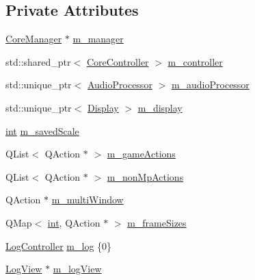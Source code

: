 \subsection*{Private Attributes}
\begin{DoxyCompactItemize}
\item 
\mbox{\hyperlink{class_q_g_b_a_1_1_core_manager}{Core\+Manager}} $\ast$ \mbox{\hyperlink{class_q_g_b_a_1_1_window_ae6749aa95d0f10edc7b8cc9e367bc45d}{m\+\_\+manager}}
\item 
std\+::shared\+\_\+ptr$<$ \mbox{\hyperlink{class_q_g_b_a_1_1_core_controller}{Core\+Controller}} $>$ \mbox{\hyperlink{class_q_g_b_a_1_1_window_af35a37be583d911f9ac403912e99fb65}{m\+\_\+controller}}
\item 
std\+::unique\+\_\+ptr$<$ \mbox{\hyperlink{class_q_g_b_a_1_1_audio_processor}{Audio\+Processor}} $>$ \mbox{\hyperlink{class_q_g_b_a_1_1_window_ac81ac93ee2551f551d93ed0b9f020579}{m\+\_\+audio\+Processor}}
\item 
std\+::unique\+\_\+ptr$<$ \mbox{\hyperlink{class_q_g_b_a_1_1_display}{Display}} $>$ \mbox{\hyperlink{class_q_g_b_a_1_1_window_ae811273df69f8dab13ad706e8b3f8d1a}{m\+\_\+display}}
\item 
\mbox{\hyperlink{ioapi_8h_a787fa3cf048117ba7123753c1e74fcd6}{int}} \mbox{\hyperlink{class_q_g_b_a_1_1_window_a5527e27d8324c56e497a91c9b1153aaa}{m\+\_\+saved\+Scale}}
\item 
Q\+List$<$ Q\+Action $\ast$ $>$ \mbox{\hyperlink{class_q_g_b_a_1_1_window_a2ede84d8bfb0732cdfcda8b4c7cc91c1}{m\+\_\+game\+Actions}}
\item 
Q\+List$<$ Q\+Action $\ast$ $>$ \mbox{\hyperlink{class_q_g_b_a_1_1_window_aeb8d1a16c1ae24abea5c22dbcbfe7778}{m\+\_\+non\+Mp\+Actions}}
\item 
Q\+Action $\ast$ \mbox{\hyperlink{class_q_g_b_a_1_1_window_aca9c0cc6b517593e9c0c756073109189}{m\+\_\+multi\+Window}}
\item 
Q\+Map$<$ \mbox{\hyperlink{ioapi_8h_a787fa3cf048117ba7123753c1e74fcd6}{int}}, Q\+Action $\ast$ $>$ \mbox{\hyperlink{class_q_g_b_a_1_1_window_a2ef7e887a0d6bc5771cb712cc601280a}{m\+\_\+frame\+Sizes}}
\item 
\mbox{\hyperlink{class_q_g_b_a_1_1_log_controller}{Log\+Controller}} \mbox{\hyperlink{class_q_g_b_a_1_1_window_ad2cf4d356c9a91ebaeb4ebce7b19235e}{m\+\_\+log}} \{0\}
\item 
\mbox{\hyperlink{class_q_g_b_a_1_1_log_view}{Log\+View}} $\ast$ \mbox{\hyperlink{class_q_g_b_a_1_1_window_a4cfdc92f35e3e6dc3a3be1cb89b767f2}{m\+\_\+log\+View}}
\item 

\end{DoxyCompactItemize}
